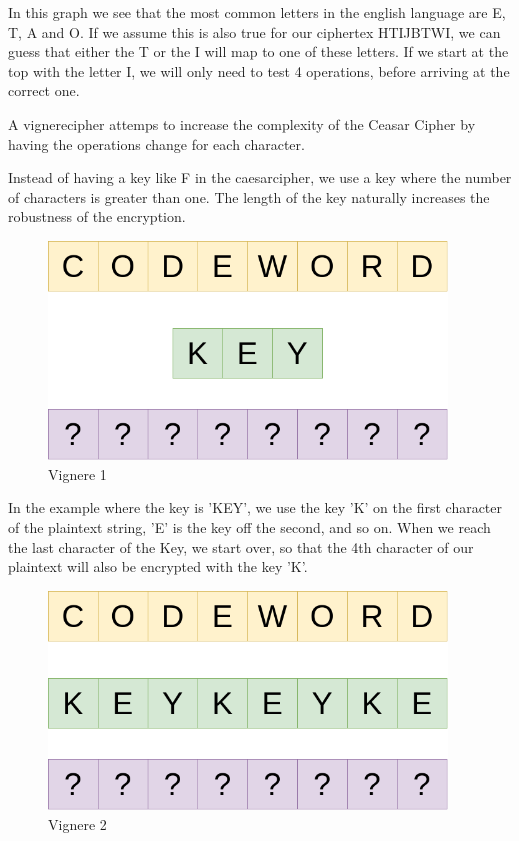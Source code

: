 \documentclass{article}
\begin{document}
In this graph we see that the most common letters in the english language are E, T, A and O. If we assume this is also true for our ciphertex HTIJBTWI, we can guess that either the T or the I will map to one of these letters. If we start at the top with the letter I, we will only need to test 4 operations, before arriving at the correct one. 

A vignerecipher attemps to increase the complexity of the Ceasar Cipher by having the operations change for each character. 

Instead of having a key like F in the caesarcipher, we use a key where the number of characters is greater than one. The length of the key naturally increases the robustness of the encryption. 

\begin{figure}[H]
 \centering
  \includegraphics[width=300pt]{img/vigneredraw1.png}
 \caption{Vignere 1}
 \end{figure}

In the example where the key is 'KEY', we use the key 'K' on the first character of the plaintext string, 'E' is the key off the second, and so on. When we reach the last character of the Key, we start over, so that the 4th character of our plaintext will also be encrypted with the key 'K'.

\begin{figure}[H]
 \centering
  \includegraphics[width=300pt]{img/vigneredraw2.png}
 \caption{Vignere 2}
 \end{figure}
\end{document}
